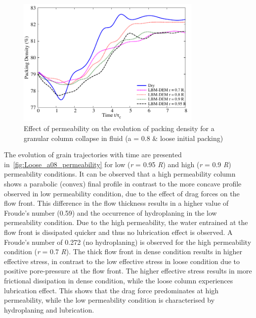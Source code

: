 \begin{figure}
	\centering
    \includegraphics[width=0.8\textwidth]{Packing_Density_a08_loose}
    \caption{Effect of permeability on the evolution of packing density for a 
    granular column collapse in fluid (a = 0.8 \& loose initial packing)}
    \label{fig:Packing_Density_a08_loose}
\end{figure}


The evolution of grain trajectories with time are presented 
in~\cref{fig:Loose_a08_permeability} for low (\textit{r} = 0.95 \textit{R}) and 
high (\textit{r} = 0.9 \textit{R})
permeability conditions. It can be observed that a high 
permeability column shows a parabolic (convex) final profile in contrast to the 
more concave profile observed in low permeability condition, due to the effect 
of drag forces on the flow front. This difference in the flow thickness results 
in a higher value of Froude's number (0.59) and the occurrence of hydroplaning 
in the low permeability condition. Due to the high permeability, the water 
entrained at the flow front is dissipated quicker and 
thus no lubrication effect is observed. A Froude's number of 0.272 (no 
hydroplaning) is observed for the high permeability condition (\textit{r} = 0.7 
\textit{R}). The 
thick flow front in dense condition results in higher effective stress, in 
contrast to the low effective stress in loose condition due to positive 
pore-pressure at the flow front. The higher effective stress results in more 
frictional dissipation in dense condition, while the loose column experiences
lubrication effect. This shows that the drag force predominates at high 
permeability, while the low permeability condition is characterised by 
hydroplaning and lubrication.

